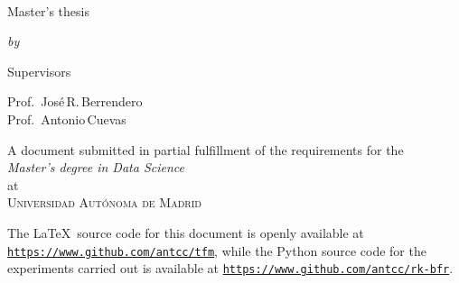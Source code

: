 \begin{titlepage}
  \vspace*{5cm}
  \makeatletter
  \begin{center}
    \begin{singlespace*}
    \begin{Huge}
      \@title
    \end{Huge}\\[1cm]
    \begin{LARGE}
      Master's thesis
    \end{LARGE}
    \vskip 0.1cm
    \begin{large}
    \emph{by}
  \end{large}
    \vskip 0.175cm
    \begin{Large}
    \textsc{\@author}
  \end{Large}
  \end{singlespace*}
    \vfill
    \begin{Large}
    Supervisors
  \end{Large}
    \vskip 0.1cm
    \begin{large}
    Prof.\, José\,R.\,Berrendero\\
    Prof.\, Antonio\,Cuevas\\[1cm]
  \end{large}

    A document submitted in partial fulfillment
    of the requirements for the\\
    \emph{Master's degree in Data Science}\\
    at\\
    \textsc{Universidad Autónoma de Madrid}
  \end{center}
  \makeatother
\end{titlepage}
\newpage


\thispagestyle{empty}
\null
\newpage



\thispagestyle{empty}
\pagebreak
\hspace{0pt}
\vfill
\begin{center}
    \begin{minipage}[t]{12.5cm}
        \doclicenseThis
        The \LaTeX\ source code for this document is openly available at \texttt{\url{https://www.github.com/antcc/tfm}}, while the Python source code for the experiments carried out is available at \texttt{\url{https://www.github.com/antcc/rk-bfr}}.
    \end{minipage}
\end{center}
\vfill
\hspace{0pt}
\pagebreak
\newpage

\thispagestyle{empty}
\null
\newpage
